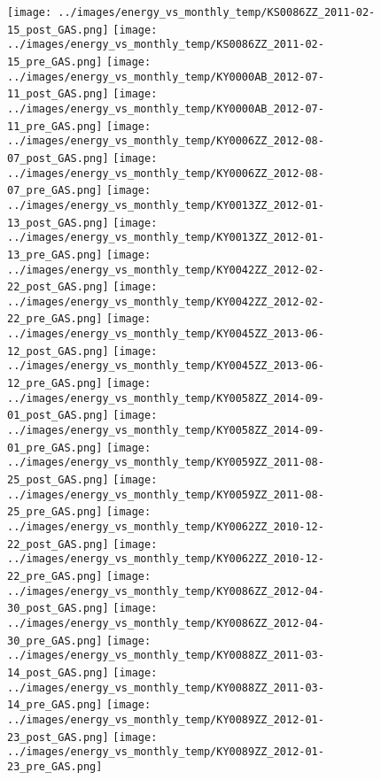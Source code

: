 \clearpage
\begin{figure}
\centering
\texttt{[image: ../images/energy\_vs\_monthly\_temp/KS0086ZZ\_2011-02-15\_post\_GAS.png]}
\texttt{[image: ../images/energy\_vs\_monthly\_temp/KS0086ZZ\_2011-02-15\_pre\_GAS.png]}
\texttt{[image: ../images/energy\_vs\_monthly\_temp/KY0000AB\_2012-07-11\_post\_GAS.png]}
\texttt{[image: ../images/energy\_vs\_monthly\_temp/KY0000AB\_2012-07-11\_pre\_GAS.png]}
\texttt{[image: ../images/energy\_vs\_monthly\_temp/KY0006ZZ\_2012-08-07\_post\_GAS.png]}
\texttt{[image: ../images/energy\_vs\_monthly\_temp/KY0006ZZ\_2012-08-07\_pre\_GAS.png]}
\texttt{[image: ../images/energy\_vs\_monthly\_temp/KY0013ZZ\_2012-01-13\_post\_GAS.png]}
\texttt{[image: ../images/energy\_vs\_monthly\_temp/KY0013ZZ\_2012-01-13\_pre\_GAS.png]}
\texttt{[image: ../images/energy\_vs\_monthly\_temp/KY0042ZZ\_2012-02-22\_post\_GAS.png]}
\texttt{[image: ../images/energy\_vs\_monthly\_temp/KY0042ZZ\_2012-02-22\_pre\_GAS.png]}
\texttt{[image: ../images/energy\_vs\_monthly\_temp/KY0045ZZ\_2013-06-12\_post\_GAS.png]}
\texttt{[image: ../images/energy\_vs\_monthly\_temp/KY0045ZZ\_2013-06-12\_pre\_GAS.png]}
\texttt{[image: ../images/energy\_vs\_monthly\_temp/KY0058ZZ\_2014-09-01\_post\_GAS.png]}
\texttt{[image: ../images/energy\_vs\_monthly\_temp/KY0058ZZ\_2014-09-01\_pre\_GAS.png]}
\texttt{[image: ../images/energy\_vs\_monthly\_temp/KY0059ZZ\_2011-08-25\_post\_GAS.png]}
\texttt{[image: ../images/energy\_vs\_monthly\_temp/KY0059ZZ\_2011-08-25\_pre\_GAS.png]}
\texttt{[image: ../images/energy\_vs\_monthly\_temp/KY0062ZZ\_2010-12-22\_post\_GAS.png]}
\texttt{[image: ../images/energy\_vs\_monthly\_temp/KY0062ZZ\_2010-12-22\_pre\_GAS.png]}
\texttt{[image: ../images/energy\_vs\_monthly\_temp/KY0086ZZ\_2012-04-30\_post\_GAS.png]}
\texttt{[image: ../images/energy\_vs\_monthly\_temp/KY0086ZZ\_2012-04-30\_pre\_GAS.png]}
\texttt{[image: ../images/energy\_vs\_monthly\_temp/KY0088ZZ\_2011-03-14\_post\_GAS.png]}
\texttt{[image: ../images/energy\_vs\_monthly\_temp/KY0088ZZ\_2011-03-14\_pre\_GAS.png]}
\texttt{[image: ../images/energy\_vs\_monthly\_temp/KY0089ZZ\_2012-01-23\_post\_GAS.png]}
\texttt{[image: ../images/energy\_vs\_monthly\_temp/KY0089ZZ\_2012-01-23\_pre\_GAS.png]}
\end{figure}
